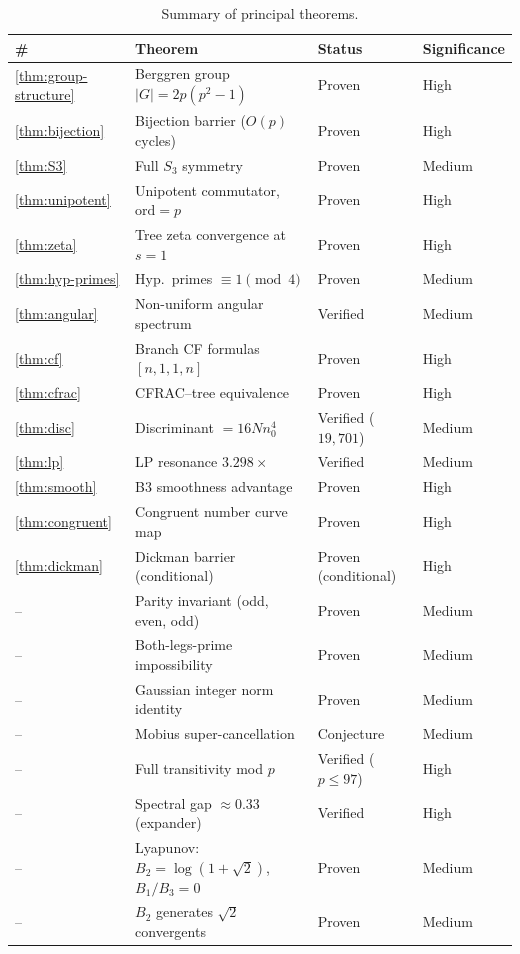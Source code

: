 \documentclass[12pt]{amsart}
\theoremstyle{definition}
\theoremstyle{remark}
\begin{document}
\begin{table}[htbp]
\centering
\caption{Summary of principal theorems.}\label{tab:theorems}
\begin{tabular}{@{}llll@{}}
\toprule
\# & Theorem & Status & Significance \\
\midrule
\ref{thm:group-structure} & Berggren group $|G|=2p(p^{2}-1)$ & Proven & High \\
\ref{thm:bijection} & Bijection barrier ($O(p)$ cycles) & Proven & High \\
\ref{thm:S3} & Full $S_{3}$ symmetry & Proven & Medium \\
\ref{thm:unipotent} & Unipotent commutator, $\mathrm{ord}=p$ & Proven & High \\
\ref{thm:zeta} & Tree zeta convergence at $s=1$ & Proven & High \\
\ref{thm:hyp-primes} & Hyp.\ primes $\equiv1\pmod{4}$ & Proven & Medium \\
\ref{thm:angular} & Non-uniform angular spectrum & Verified & Medium \\
\ref{thm:cf} & Branch CF formulas $[n,1,1,n]$ & Proven & High \\
\ref{thm:cfrac} & CFRAC--tree equivalence & Proven & High \\
\ref{thm:disc} & Discriminant $=16Nn_{0}^{4}$ & Verified ($19{,}701$) & Medium \\
\ref{thm:lp} & LP resonance $3.298\times$ & Verified & Medium \\
\ref{thm:smooth} & B3 smoothness advantage & Proven & High \\
\ref{thm:congruent} & Congruent number curve map & Proven & High \\
\ref{thm:dickman} & Dickman barrier (conditional) & Proven (conditional) & High \\
-- & Parity invariant (odd, even, odd) & Proven & Medium \\
-- & Both-legs-prime impossibility & Proven & Medium \\
-- & Gaussian integer norm identity & Proven & Medium \\
-- & Mobius super-cancellation & Conjecture & Medium \\
-- & Full transitivity mod $p$ & Verified ($p\le97$) & High \\
-- & Spectral gap $\approx0.33$ (expander) & Verified & High \\
-- & Lyapunov: $B_{2}=\log(1{+}\sqrt{2})$, $B_{1}/B_{3}=0$ & Proven & Medium \\
-- & $B_{2}$ generates $\sqrt{2}$ convergents & Proven & Medium \\

\end{tabular}
\end{table}
\end{document}
